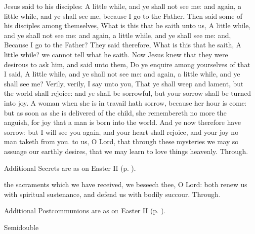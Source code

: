 Jesus said to his disciples: A little while, and ye shall not see me: and again, a little while, and ye shall see me, because I go to the Father. Then said some of his disciples among themselves, What is this that he saith unto us, A little while, and ye shall not see me: and again, a little while, and ye shall see me: and, Because I go to the Father? They said therefore, What is this that he saith, A little while? we cannot tell what he saith. Now Jesus knew that they were desirous to ask him, and said unto them, Do ye enquire among yourselves of that I said, A little while, and ye shall not see me: and again, a little while, and ye shall see me? Verily, verily, I say unto you, That ye shall weep and lament, but the world shall rejoice: and ye shall be sorrowful, but your sorrow shall be turned into joy. A woman when she is in travail hath sorrow, because her hour is come: but as soon as she is delivered of the child, she remembereth no more the anguish, for joy that a man is born into the world. And ye now therefore have sorrow: but I will see you again, and your heart shall rejoice, and your joy no man taketh from you.
\secret
{} to us, O Lord, that through these mysteries we may so assuage our earthly desires, that we may learn to love things heavenly. Through.

\begin{rubric}
    Additional Secrets are as on Easter II (p. \pageref{EasterII}).
\end{rubric}
\postcommunion
{} the sacraments which we have received, we beseech thee, O Lord: both renew us with spiritual sustenance, and defend us with bodily succour. Through.
\begin{rubric}
    Additional Postcommunions are as on Easter II (p. \pageref{EasterII}).
\end{rubric}

\begin{inhead}
    {Semidouble}
\end{inhead}
\par\noindent
{}

